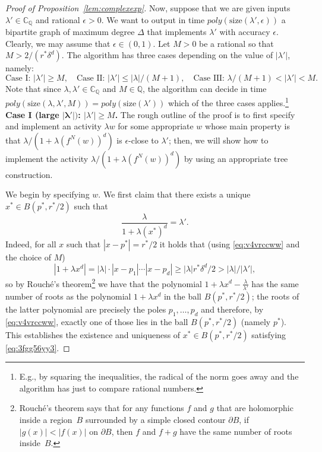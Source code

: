 \documentclass[11pt]{article}
\def\QQ{\mathbb{Q}}
\def\CQ{\mathbb{C}_{\mathbb{Q}}}
\newcommand{\size}[1]{\mathrm{size}(#1)}
\newcommand{\eps}{\epsilon}
\begin{document}
\begin{proof}[Proof of Proposition~\ref{lem:complexexp}]
Now, suppose that we are given inputs $\lambda'\in \CQ$ and rational $\eps>0$.  We want to output in time $poly(\size{\lambda',\epsilon})$ a bipartite graph of maximum degree $\Delta$ that implements $\lambda'$ with accuracy $\epsilon$. Clearly, we may assume that $\eps\in (0,1)$.   Let $M>0$ be a rational so that $M>2/(r^* \delta^d)$. The algorithm has three cases depending on the value of $|\lambda'|$, namely:
\begin{equation*}
\mbox{Case I: $|\lambda'|\geq M$}, \quad \mbox{Case II: $|\lambda'|\leq |\lambda|/(M+1)$}, \quad \mbox{Case III: $\lambda/(M+1) <|\lambda'|<M$}.
\end{equation*}
Note that since $\lambda,\lambda'\in \CQ$ and $M\in \QQ$, the algorithm can decide in time $poly(\size{\lambda,\lambda',M})=poly(\size{\lambda'})$ which of the three cases applies.\footnote{E.g., by squaring the inequalities, the radical of the norm goes away and the algorithm has just to compare rational numbers.}
\vskip 0.2cm
\noindent \textbf{Case I (large $\mathbf{|\lambda'|})$: $|\lambda'|\geq M$.}  The rough outline of the proof is to first specify and implement an activity $\lambda w$ for some appropriate $w$ whose main property is that $\lambda/(1+\lambda (f^{N}(w))^{d})$ is $\epsilon$-close to $\lambda'$; then, we will show how to implement the activity $\lambda/(1+\lambda (f^{N}(w))^{d})$ by using an appropriate tree construction.

We begin by specifying $w$. We first claim that there exists a unique $x^*\in B(p^*,r^*/2)$ such that
\begin{equation}\label{eq:3fgg56yy3}
\frac{\lambda}{1+\lambda (x^*)^{d}}=\lambda'.
\end{equation}
Indeed, for all $x$ such that $|x-p^*|=r^*/2$  it holds that (using \eqref{eq:v4vrccww} and the choice of $M$)
\begin{equation}\label{eq:4f4f4}
|1+\lambda x^{d}|=|\lambda|\cdot |x-p_1|\cdots |x-p_d|\geq |\lambda|r^*\delta^d/2> |\lambda|/|\lambda'|,
\end{equation}
so by Rouch\'{e}'s theorem\footnote{Rouch\'{e}'s theorem says that for any functions $f$ and $g$ that are holomorphic inside a region~$B$ surrounded by 
a simple closed contour $\partial B$, if $|g(x)| < |f(x)|$ on $\partial B$, then $f$ and $f+g$ have the same number of roots inside~$B$.} we have that the polynomial $1+\lambda x^{d}-\frac{\lambda}{\lambda'}$ has the same number of roots as the polynomial $1+\lambda x^{d}$ in the ball $B(p^*,r^*/2)$; the roots of the latter polynomial are precisely the poles $p_1,\hdots, p_d$ and therefore, by \eqref{eq:v4vrccww},  exactly one of those  lies in the ball $B(p^*,r^*/2)$ (namely $p^*$). This establishes the existence and uniqueness of $x^*\in B(p^*,r^*/2)$ satisfying \eqref{eq:3fgg56yy3}. 


\end{proof}
\end{document}
